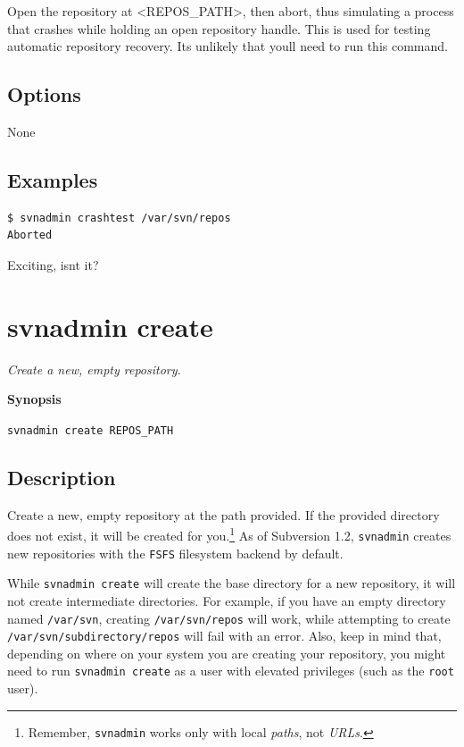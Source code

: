Open the repository at \textless REPOS\_PATH\textgreater, then abort,
thus simulating a process that crashes while holding an open repository
handle. This is used for testing automatic repository recovery.
It\textquotesingle s unlikely that you\textquotesingle ll need to run
this command.

\subsection{Options}

None

\subsection{Examples}

\begin{verbatim}
$ svnadmin crashtest /var/svn/repos
Aborted
\end{verbatim}

Exciting, isn\textquotesingle t it?

\section{svnadmin create}\label{svn.ref.svnadmin.c.create}

\emph{Create a new, empty repository.}

\textbf{Synopsis}

\texttt{svnadmin\ create\ REPOS\_PATH}

\subsection{Description}

Create a new, empty repository at the path provided. If the provided
directory does not exist, it will be created for you.\footnote{Remember,
  \texttt{svnadmin} works only with local \emph{paths}, not \emph{URLs}.}
As of Subversion 1.2, \texttt{svnadmin} creates new repositories with
the \texttt{FSFS} filesystem backend by default.

While \texttt{svnadmin\ create} will create the base directory for a new
repository, it will not create intermediate directories. For example, if
you have an empty directory named \texttt{/var/svn}, creating
\texttt{/var/svn/repos} will work, while attempting to create
\texttt{/var/svn/subdirectory/repos} will fail with an error. Also, keep
in mind that, depending on where on your system you are creating your
repository, you might need to run \texttt{svnadmin\ create} as a user
with elevated privileges (such as the \texttt{root} user).

